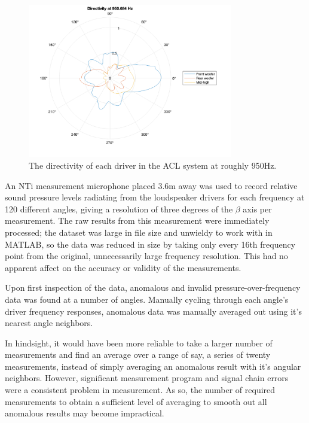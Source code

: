 \documentclass{report}
\begin{document}
        \begin{figure}[H]
            \centering
            \hspace{2cm} \includegraphics[width = 0.8\textwidth]{figs/initialDirectivity.png}
            \caption{The directivity of each driver in the ACL system at roughly 950Hz.}
            \label{initialDirectivity}
        \end{figure}
        \newpage


        An NTi measurement microphone placed 3.6m away was used to record relative sound pressure levels radiating from the loudspeaker drivers for each frequency at 120 different angles, giving a resolution of three degrees of the $\beta$ axis per measurement.
        The raw results from this measurement were immediately processed; the dataset was large in file size and unwieldy to work with in MATLAB, so the data was reduced in size by taking only every 16th frequency point from the original, unnecessarily large frequency resolution.
        This had no apparent affect on the accuracy or validity of the measurements.

        Upon first inspection of the data, anomalous and invalid pressure-over-frequency data was found at a number of angles.
        Manually cycling through each angle's driver frequency responses, anomalous data was manually averaged out using it's nearest angle neighbors.     

        In hindsight, it would have been more reliable to take a larger number of measurements and find an average over a range of say, a series of twenty measurements, instead of simply averaging an anomalous result with it's angular neighbors.
        However, significant measurement program and signal chain errors were a consistent problem in measurement.
        As so, the number of required measurements to obtain a sufficient level of averaging to smooth out all anomalous results may become impractical.
\end{document}
